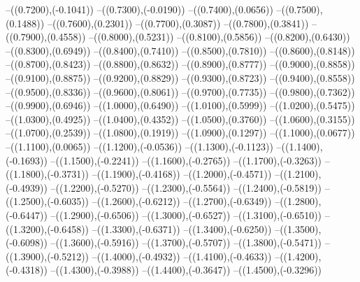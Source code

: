 {	--({\sx*(0.7200)},{\sy*(-0.1041)})
	--({\sx*(0.7300)},{\sy*(-0.0190)})
	--({\sx*(0.7400)},{\sy*(0.0656)})
	--({\sx*(0.7500)},{\sy*(0.1488)})
	--({\sx*(0.7600)},{\sy*(0.2301)})
	--({\sx*(0.7700)},{\sy*(0.3087)})
	--({\sx*(0.7800)},{\sy*(0.3841)})
	--({\sx*(0.7900)},{\sy*(0.4558)})
	--({\sx*(0.8000)},{\sy*(0.5231)})
	--({\sx*(0.8100)},{\sy*(0.5856)})
	--({\sx*(0.8200)},{\sy*(0.6430)})
	--({\sx*(0.8300)},{\sy*(0.6949)})
	--({\sx*(0.8400)},{\sy*(0.7410)})
	--({\sx*(0.8500)},{\sy*(0.7810)})
	--({\sx*(0.8600)},{\sy*(0.8148)})
	--({\sx*(0.8700)},{\sy*(0.8423)})
	--({\sx*(0.8800)},{\sy*(0.8632)})
	--({\sx*(0.8900)},{\sy*(0.8777)})
	--({\sx*(0.9000)},{\sy*(0.8858)})
	--({\sx*(0.9100)},{\sy*(0.8875)})
	--({\sx*(0.9200)},{\sy*(0.8829)})
	--({\sx*(0.9300)},{\sy*(0.8723)})
	--({\sx*(0.9400)},{\sy*(0.8558)})
	--({\sx*(0.9500)},{\sy*(0.8336)})
	--({\sx*(0.9600)},{\sy*(0.8061)})
	--({\sx*(0.9700)},{\sy*(0.7735)})
	--({\sx*(0.9800)},{\sy*(0.7362)})
	--({\sx*(0.9900)},{\sy*(0.6946)})
	--({\sx*(1.0000)},{\sy*(0.6490)})
	--({\sx*(1.0100)},{\sy*(0.5999)})
	--({\sx*(1.0200)},{\sy*(0.5475)})
	--({\sx*(1.0300)},{\sy*(0.4925)})
	--({\sx*(1.0400)},{\sy*(0.4352)})
	--({\sx*(1.0500)},{\sy*(0.3760)})
	--({\sx*(1.0600)},{\sy*(0.3155)})
	--({\sx*(1.0700)},{\sy*(0.2539)})
	--({\sx*(1.0800)},{\sy*(0.1919)})
	--({\sx*(1.0900)},{\sy*(0.1297)})
	--({\sx*(1.1000)},{\sy*(0.0677)})
	--({\sx*(1.1100)},{\sy*(0.0065)})
	--({\sx*(1.1200)},{\sy*(-0.0536)})
	--({\sx*(1.1300)},{\sy*(-0.1123)})
	--({\sx*(1.1400)},{\sy*(-0.1693)})
	--({\sx*(1.1500)},{\sy*(-0.2241)})
	--({\sx*(1.1600)},{\sy*(-0.2765)})
	--({\sx*(1.1700)},{\sy*(-0.3263)})
	--({\sx*(1.1800)},{\sy*(-0.3731)})
	--({\sx*(1.1900)},{\sy*(-0.4168)})
	--({\sx*(1.2000)},{\sy*(-0.4571)})
	--({\sx*(1.2100)},{\sy*(-0.4939)})
	--({\sx*(1.2200)},{\sy*(-0.5270)})
	--({\sx*(1.2300)},{\sy*(-0.5564)})
	--({\sx*(1.2400)},{\sy*(-0.5819)})
	--({\sx*(1.2500)},{\sy*(-0.6035)})
	--({\sx*(1.2600)},{\sy*(-0.6212)})
	--({\sx*(1.2700)},{\sy*(-0.6349)})
	--({\sx*(1.2800)},{\sy*(-0.6447)})
	--({\sx*(1.2900)},{\sy*(-0.6506)})
	--({\sx*(1.3000)},{\sy*(-0.6527)})
	--({\sx*(1.3100)},{\sy*(-0.6510)})
	--({\sx*(1.3200)},{\sy*(-0.6458)})
	--({\sx*(1.3300)},{\sy*(-0.6371)})
	--({\sx*(1.3400)},{\sy*(-0.6250)})
	--({\sx*(1.3500)},{\sy*(-0.6098)})
	--({\sx*(1.3600)},{\sy*(-0.5916)})
	--({\sx*(1.3700)},{\sy*(-0.5707)})
	--({\sx*(1.3800)},{\sy*(-0.5471)})
	--({\sx*(1.3900)},{\sy*(-0.5212)})
	--({\sx*(1.4000)},{\sy*(-0.4932)})
	--({\sx*(1.4100)},{\sy*(-0.4633)})
	--({\sx*(1.4200)},{\sy*(-0.4318)})
	--({\sx*(1.4300)},{\sy*(-0.3988)})
	--({\sx*(1.4400)},{\sy*(-0.3647)})
	--({\sx*(1.4500)},{\sy*(-0.3296)})
}
